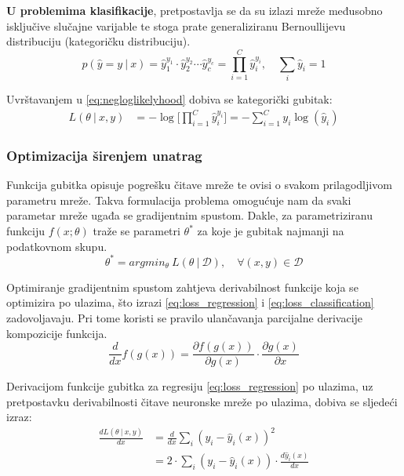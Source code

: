 \documentclass[times, utf8, numeric, diplomski]{fer}
\def\pfrac#1#2{\frac{\partial #1}{\partial #2}}
\def\dfrac#1#2{\frac{d #1}{d #2}}
\def\probsep{\ |\ }
\def\dataset{\mathcal{D}}
\begin{document}
\textbf{U problemima klasifikacije}, pretpostavlja se da su izlazi mreže međusobno isključive slučajne varijable te stoga prate generaliziranu Bernoullijevu distribuciju (kategoričku distribuciju).
\begin{equation}
p(\hat{y}=y \probsep x) = \hat{y}_1^{y_1} \cdot \hat{y}_2^{y_2} \cdots \hat{y}_c^{y_c} 
= \prod_{i=1}^C \hat{y}_i^{y_i}, \quad \sum_i \hat{y}_i = 1
\end{equation}

Uvrštavanjem u \ref{eq:negloglikelyhood} dobiva se kategorički gubitak:
\begin{align}
\label{eq:loss_classification}
L(\theta \probsep x,y) &= - \log \Big[ \prod_{i=1}^C \hat{y}_i^{y_i} \Big] = - \sum_{i=1}^C y_i \log (\hat{y}_i)
\end{align}

\subsubsection{Optimizacija širenjem unatrag}
\label{sec:backprop}
Funkcija gubitka opisuje pogrešku čitave mreže te ovisi o svakom prilagodljivom parametru mreže. Takva formulacija problema omogućuje nam da svaki parametar mreže ugađa se gradijentnim spustom. Dakle, za parametriziranu funkciju $f(x;\theta)$ traže se parametri $\theta^*$ za koje je gubitak najmanji na podatkovnom skupu.
\begin{equation}
\theta^* = argmin_\theta\ L(\theta \probsep \dataset), \quad \forall (x,y) \in \dataset
\end{equation}

Optimiranje gradijentnim spustom zahtjeva derivabilnost funkcije koja se optimizira po ulazima, što izrazi \eqref{eq:loss_regression} i \eqref{eq:loss_classification} zadovoljavaju. Pri tome koristi se pravilo ulančavanja parcijalne derivacije kompozicije funkcija.
\begin{equation}
\label{eq:partial_rule}
\dfrac{}{x} f(g(x)) = \pfrac{f(g(x))}{g(x)} \cdot \pfrac{g(x)}{x}
\end{equation}

Derivacijom funkcije gubitka za regresiju \eqref{eq:loss_regression} po ulazima, uz pretpostavku derivabilnosti čitave neuronske mreže po ulazima, dobiva se sljedeći izraz:
\begin{align}
\dfrac{L(\theta \probsep x,y)}{x} &= \dfrac{}{x}\sum_i(y_i - \hat{y}_i(x))^2 \nonumber \\
&= 2 \cdot \sum_i (y_i - \hat{y}_i(x)) \cdot \dfrac{\hat{y}_i(x)}{x}
\end{align}
\end{document}
